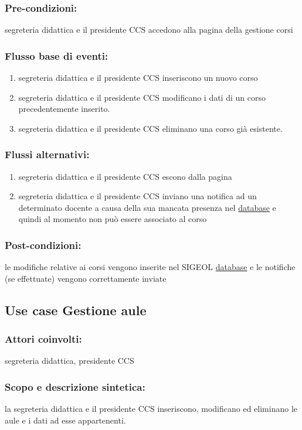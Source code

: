 \documentclass[11pt,a4paper]{article}
\begin{document}
\subsubsection*{Pre-condizioni:}
segreteria didattica e il presidente CCS accedono alla pagina della gestione corsi
\subsubsection*{Flusso base di eventi:}
\begin{enumerate}
 \item segreteria didattica e il presidente CCS inseriscono un nuovo corso 
 \item segreteria didattica e il presidente CCS modificano i dati di un corso precedentemente inserito.
 \item segreteria didattica e il presidente CCS eliminano una corso già esistente.
\end{enumerate}
\subsubsection*{Flussi alternativi:}
\begin{enumerate} 
\item segreteria didattica e il presidente CCS escono dalla pagina
\item segreteria didattica e il presidente CCS inviano una notifica ad un determinato docente a causa della sua mancata presenza nel \underline{database} e quindi al momento non può essere associato al corso
\end{enumerate}
\subsubsection*{Post-condizioni:}
le modifiche relative ai corsi vengono inserite nel SIGEOL \underline{database} e le notifiche (se effettuate) vengono correttamente 
inviate

\subsection{Use case Gestione aule}
\subsubsection*{Attori coinvolti:}
segreteria didattica, presidente CCS
\subsubsection*{Scopo e descrizione sintetica:}
la segreteria didattica e il presidente CCS inseriscono, modificano ed eliminano le aule e i dati ad esse appartenenti.
\end{document}
